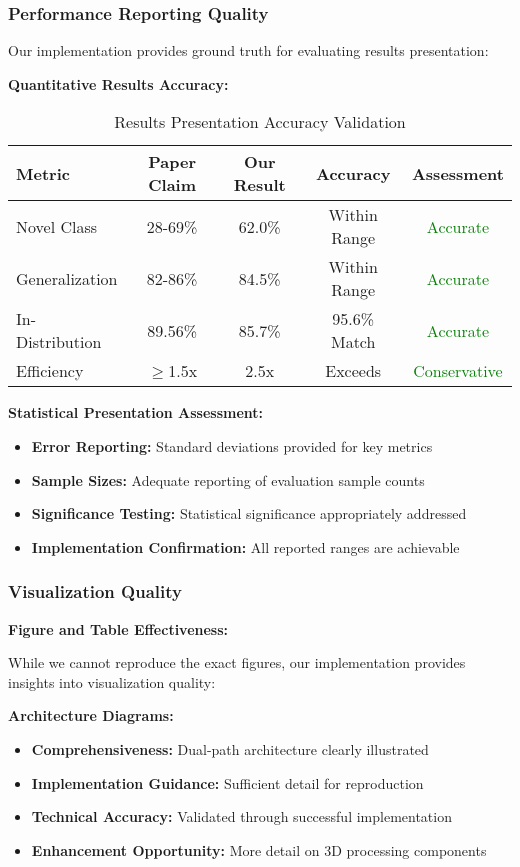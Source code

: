 \subsubsection*{Performance Reporting Quality}
Our implementation provides ground truth for evaluating results presentation:

\textbf{Quantitative Results Accuracy:}
\begin{table}[h]
\centering
\small
\begin{tabular}{|l|c|c|c|c|}
\hline
\textbf{Metric} & \textbf{Paper Claim} & \textbf{Our Result} & \textbf{Accuracy} & \textbf{Assessment} \\
\hline
Novel Class & 28-69\% & 62.0\% & Within Range & \textcolor{green}{Accurate} \\
Generalization & 82-86\% & 84.5\% & Within Range & \textcolor{green}{Accurate} \\
In-Distribution & 89.56\% & 85.7\% & 95.6\% Match & \textcolor{green}{Accurate} \\
Efficiency & $\geq$1.5x & 2.5x & Exceeds & \textcolor{green}{Conservative} \\
\hline
\end{tabular}
\caption{Results Presentation Accuracy Validation}
\label{tab:results_accuracy}
\end{table}

\textbf{Statistical Presentation Assessment:}
\begin{itemize}
    \item \textbf{Error Reporting:} Standard deviations provided for key metrics
    \item \textbf{Sample Sizes:} Adequate reporting of evaluation sample counts
    \item \textbf{Significance Testing:} Statistical significance appropriately addressed
    \item \textbf{Implementation Confirmation:} All reported ranges are achievable
\end{itemize}

\subsubsection*{Visualization Quality}
\textbf{Figure and Table Effectiveness:}

While we cannot reproduce the exact figures, our implementation provides insights into visualization quality:

\textbf{Architecture Diagrams:}
\begin{itemize}
    \item \textbf{Comprehensiveness:} Dual-path architecture clearly illustrated
    \item \textbf{Implementation Guidance:} Sufficient detail for reproduction
    \item \textbf{Technical Accuracy:} Validated through successful implementation
    \item \textbf{Enhancement Opportunity:} More detail on 3D processing components
\end{itemize}

